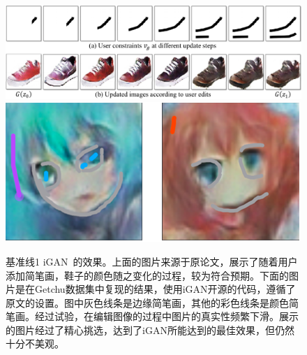 \documentclass[a4paper,12pt,UTF8]{ctexart}
\newcommand{\kai}{\CJKfamily{zhkai}}	%
\begin{document}
\begin{figure}[H]
  \centering
  \includegraphics[width=0.9\linewidth]{figs/baseline_shoe.PNG}
  \includegraphics[width=0.9\linewidth]{figs/baseline1.PNG}
  \caption{\kai 基准线1 iGAN~\cite{Zhu2016Generative}的效果。上面的图片来源于原论文，展示了随着用户添加简笔画，鞋子的颜色随之变化的过程，较为符合预期。下面的图片是在Getchu数据集中复现的结果，使用iGAN开源的代码，遵循了原文的设置。图中灰色线条是边缘简笔画，其他的彩色线条是颜色简笔画。经过试验，在编辑图像的过程中图片的真实性频繁下滑。展示的图片经过了精心挑选，达到了iGAN所能达到的最佳效果，但仍然十分不美观。}
  \label{fig:baseline1}
\end{figure}
\end{document}
